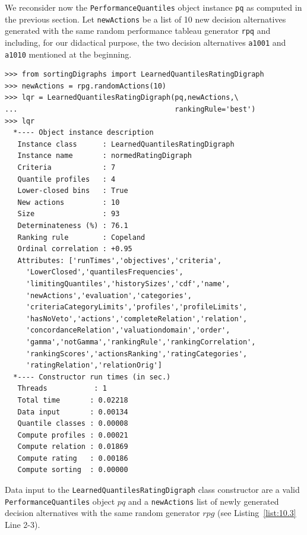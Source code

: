 We reconsider now the \texttt{PerformanceQuantiles} object instance \texttt{pq} as computed in the previous section. Let \texttt{newActions} be a list of 10 new decision alternatives generated with the same random performance tableau generator \texttt{rpq} and including, for our didactical purpose, the two decision alternatives \texttt{a1001} and \texttt{a1010} mentioned at the beginning.
\begin{lstlisting}[caption={Computing the absolute rating of 10 new decision alternatives},label=list:10.4]
>>> from sortingDigraphs import LearnedQuantilesRatingDigraph
>>> newActions = rpg.randomActions(10)
>>> lqr = LearnedQuantilesRatingDigraph(pq,newActions,\
...                                     rankingRule='best')
>>> lqr
  *---- Object instance description
   Instance class      : LearnedQuantilesRatingDigraph
   Instance name       : normedRatingDigraph
   Criteria            : 7
   Quantile profiles   : 4
   Lower-closed bins   : True
   New actions         : 10
   Size                : 93
   Determinateness (%) : 76.1
   Ranking rule        : Copeland
   Ordinal correlation : +0.95
   Attributes: ['runTimes','objectives','criteria',
     'LowerClosed','quantilesFrequencies',
     'limitingQuantiles','historySizes','cdf','name',
     'newActions','evaluation','categories',
     'criteriaCategoryLimits','profiles','profileLimits',
     'hasNoVeto','actions','completeRelation','relation',
     'concordanceRelation','valuationdomain','order',
     'gamma','notGamma','rankingRule','rankingCorrelation',
     'rankingScores','actionsRanking','ratingCategories',
     'ratingRelation','relationOrig']
  *---- Constructor run times (in sec.)
   Threads           : 1
   Total time       : 0.02218
   Data input       : 0.00134
   Quantile classes : 0.00008
   Compute profiles : 0.00021
   Compute relation : 0.01869
   Compute rating   : 0.00186
   Compute sorting  : 0.00000
\end{lstlisting}
Data input to the \texttt{LearnedQuantilesRatingDigraph} class constructor are a valid \texttt{PerformanceQuantiles} object $pq$ and a \texttt{newActions} list of newly generated decision alternatives with the same random generator $rpg$ (see Listing~\ref{list:10.3} Line 2-3).

